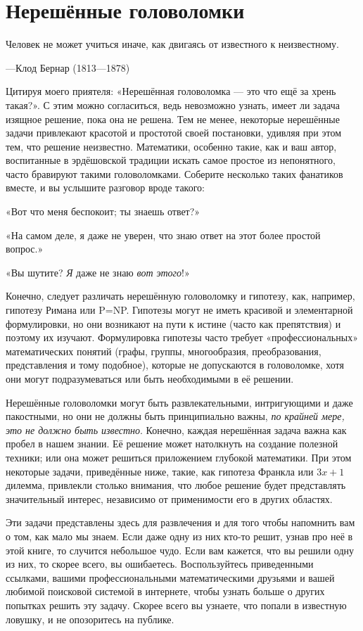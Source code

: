 \chapter*{Нерешённые головоломки}

\setlength{\epigraphwidth}{.55\textwidth}
\epigraph{Человек не может учиться иначе, как двигаясь от известного к неизвестному.}{---Клод Бернар (1813---1878)}

Цитируя моего приятеля: «Нерешённая головоломка --- это что ещё за хрень такая?».
С этим можно согласиться, ведь невозможно узнать, имеет ли задача изящное решение, пока она не решена.
Тем не менее, некоторые нерешённые задачи привлекают красотой и простотой своей постановки, удивляя при этом тем, что решение неизвестно.
Математики, особенно такие, как и ваш автор, воспитанные в эрдёшовской традиции искать самое простое из непонятного, часто бравируют такими головоломками.
Соберите несколько таких фанатиков вместе, и вы услышите разговор вроде такого:

«Вот что меня беспокоит; ты знаешь ответ?»

«На самом деле, я даже не уверен, что знаю ответ на этот более простой вопрос.»

«Вы шутите? \emph{Я} даже не знаю \emph{вот этого}!»

Конечно, следует различать нерешённую головоломку и гипотезу, как, например, гипотезу Римана или P=NP.
Гипотезы могут не иметь красивой и элементарной формулировки, но они возникают на пути к истине (часто как препятствия) и поэтому их изучают.
Формулировка гипотезы часто требует «профессиональных» математических понятий (графы, группы, многообразия, преобразования, представления и тому подобное), которые не допускаются в головоломке, хотя они могут подразумеваться или быть необходимыми в её решении.

Нерешённые головоломки могут быть развлекательными, интригующими и даже пакостными,
но они не должны быть принципиально важны, \emph{по крайней мере, это не должно быть известно}.
Конечно, каждая нерешённая задача важна как пробел в нашем знании.
Её решение может натолкнуть на создание полезной техники;
или она может решиться приложением глубокой математики.
При этом некоторые задачи, приведённые ниже, такие, как гипотеза Франкла или $3x+1$ дилемма, привлекли столько внимания, что любое решение будет представлять значительный интерес, независимо от применимости его в других областях.

Эти задачи представлены здесь для развлечения и для того чтобы напомнить вам о том, как мало мы знаем.
Если даже одну из них кто-то решит, узнав про неё в этой книге, то случится небольшое чудо.
Если вам кажется, что вы решили одну из них, то скорее всего, вы ошибаетесь.
Воспользуйтесь приведенными ссылками, вашими профессиональными математическими друзьями и вашей любимой поисковой системой в интернете, чтобы узнать больше о других попытках решить эту задачу.
Скорее всего вы узнаете, что попали в известную ловушку, и не опозоритесь на публике.

